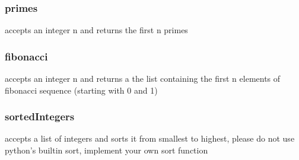 \begin{Shaded}
\begin{Highlighting}[]
\NormalTok{[}\NormalTok{,}\NormalTok{],b:[}\NormalTok{,}\NormalTok{] }\OperatorTok{{-}\textgreater{}} \NormalTok{:}
\end{Highlighting}
\end{Shaded}

\subsubsection{primes}\label{lab-exercise-5-snakes.md__primes}

accepts an integer n and returns the first n primes

\begin{Shaded}
\begin{Highlighting}[]
\NormalTok{) }\OperatorTok{{-}\textgreater{}} \NormalTok{[}\NormalTok{]:}
\end{Highlighting}
\end{Shaded}

\subsubsection{fibonacci}\label{lab-exercise-5-snakes.md__fibonacci}

accepts an integer n and returns a the list containing the first n
elements of fibonacci sequence (starting with 0 and 1)

\begin{Shaded}
\begin{Highlighting}[]
\NormalTok{) }\OperatorTok{{-}\textgreater{}} \NormalTok{[}\NormalTok{]:}
\end{Highlighting}
\end{Shaded}

\subsubsection{sortedIntegers}\label{lab-exercise-5-snakes.md__sortedintegers}

accepts a list of integers and sorts it from smallest to highest, please
do not use python's builtin sort, implement your own sort function

